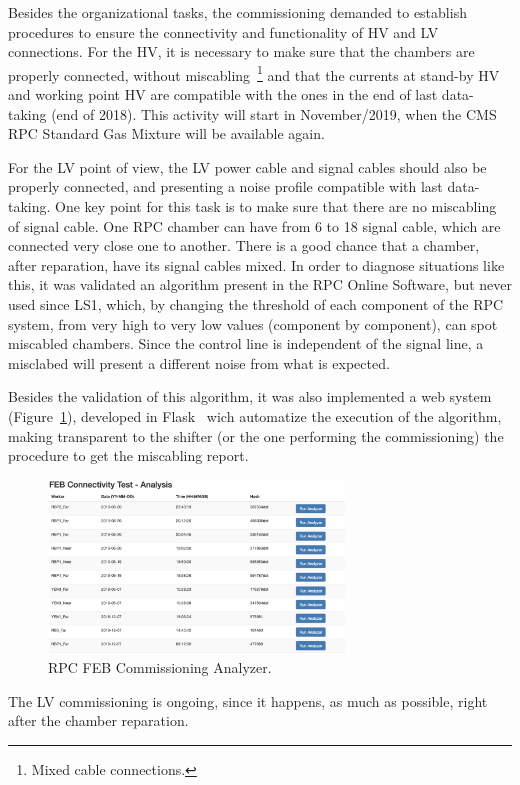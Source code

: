 Besides the organizational tasks, the commissioning demanded to establish procedures to ensure the connectivity and functionality of HV and LV connections. For the HV, it is necessary to make sure that the chambers are properly connected, without miscabling~\footnote{Mixed cable connections.} and that the currents at stand-by HV  and working point HV are compatible with the ones in the end of last data-taking (end of 2018). This activity will start in November/2019, when the CMS RPC Standard Gas Mixture will be available again.
 
For the LV point of view, the LV power cable and signal cables should also be properly connected, and presenting a noise profile compatible with last data-taking. One key point for this task is to make sure that there are no miscabling of signal cable. One RPC chamber can have from 6 to 18 signal cable, which are connected very close one to another. There is a good chance that a chamber, after reparation, have its signal cables mixed. In order to diagnose situations like this, it was validated an algorithm present in the RPC Online Software, but never used since LS1, which, by changing the threshold of each component of the RPC system, from very high to very low values (component by component), can spot miscabled chambers. Since the control line is independent of the signal line, a misclabed will present a different noise from what is expected.

Besides the validation of this algorithm, it was also implemented a web system (Figure~\ref{comm}), developed in Flask~\cite{flask} wich automatize the execution of the algorithm, making transparent to the shifter (or the one performing the commissioning) the procedure to get the miscabling report.

\begin{figure}[h]
\begin{center}
\includegraphics[width=0.7\textwidth,keepaspectratio]{figures_and_tables/rpc/comm.png}
\end{center}
\caption{RPC FEB Commissioning Analyzer.}\label{comm}
\end{figure}

The LV commissioning is ongoing, since it happens, as much as possible, right after the chamber reparation.

\clearpage